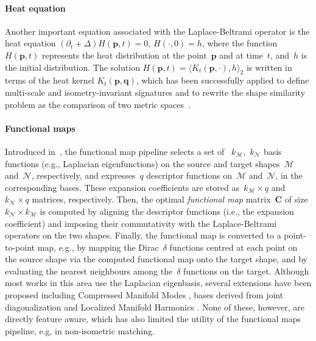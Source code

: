 \documentclass[acmtog,authorversion]{acmart}
\newcommand{\M}{\mathcal{M}}
\newcommand{\N}{\mathcal{N}}
\begin{document}
\paragraph*{Heat equation}
Another important equation associated with the Laplace-Beltrami operator is the heat equation \mbox{$(\partial_{t}+\Delta) H(\mathbf{p},t)=0$}, \mbox{$H(\cdot,0)=h$}, where the function \mbox{$H(\mathbf{p},t)$} represents the heat distribution at the point~$\mathbf{p}$ and at time~$t$, and~$h$ is the initial distribution. The solution \mbox{$H(\mathbf{p},t)=\langle K_{t}(\mathbf{p},\cdot),h\rangle_{2}$} is written in terms of the heat kernel \mbox{$K_{t}(\mathbf{p},\mathbf{q})$}, which has been successfully applied to define multi-scale and isometry-invariant signatures and to rewrite the shape similarity problem as the comparison of two metric spaces~\citep{BRONSTEIN2009,BRONSTEIN2010-TOG,COIFMAN2006,GEBAL2009,MEMOLI2011,OVSJANKOV2010,RUSTAMOV2007,SUN2009}.

\vspace{-0.5mm}
\paragraph*{Functional maps}
Introduced in~\citep{OVSJANIKOV2012}, the functional map pipeline selects a set of ~$k_\M$,~$k_\N$
basis functions (e.g., Laplacian eigenfunctions) on the source and target shapes~$\M$ and~$\N$,
respectively, and expresses~$q$ descriptor functions on~$\mathcal{M}$ and~$\mathcal{N}$, in the
corresponding bases. These expansion coefficients are stored as~$k_\M \times q$ and~$k_\N \times q$
matrices, respectively. Then, the optimal \emph{functional map} matrix~$\mathbf{C}$ of size
\mbox{$k_\N \times k_\M$} is computed by aligning the descriptor functions (i.e., the expansion
coefficient) and imposing their commutativity with the Laplace-Beltrami operators on the two
shapes. Finally, the functional map is converted to a point-to-point map, e.g., by mapping the
Dirac~$\delta$ functions centred at each point on the source shape via the computed functional map
onto the target shape, and by evaluating the nearest neighbours among the~$\delta$ functions on the
target. Although most works in this area use the Laplacian eigenbasis, several extensions have been
proposed including Compressed Manifold Modes \citep{NEUMANN2014}, bases derived from joint
diagonalization \citep{KONVATSKY2013} and Localized Manifold Harmonics
\citep{melzi2017localized}. None of these, however, are directly feature aware, which has also
limited the utility of the functional maps pipeline, e.g, in non-isometric matching.
\end{document}
